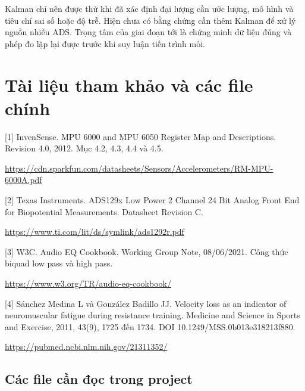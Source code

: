 \documentclass[12pt,letterpaper]{article}
\begin{document}
Kalman chỉ nên được thử khi đã xác định đại lượng cần ước lượng, mô hình và tiêu chí sai số hoặc độ trễ. Hiện chưa có bằng chứng cần thêm Kalman để xử lý nguồn nhiễu ADS. Trọng tâm của giai đoạn tới là chứng minh dữ liệu đúng và phép đo lặp lại được trước khi suy luận tiến trình mỏi.


\par\endgroup




\clearpage

\section{Tài liệu tham khảo và các file chính}

\hypertarget{ref1}{}[1] InvenSense. MPU 6000 and MPU 6050 Register Map and Descriptions. Revision 4.0, 2012. Mục 4.2, 4.3, 4.4 và 4.5.\par
\url{https://cdn.sparkfun.com/datasheets/Sensors/Accelerometers/RM-MPU-6000A.pdf}\par\medskip

\hypertarget{ref2}{}[2] Texas Instruments. ADS129x Low Power 2 Channel 24 Bit Analog Front End for Biopotential Measurements. Datasheet Revision C.\par
\url{https://www.ti.com/lit/ds/symlink/ads1292r.pdf}\par\medskip

\hypertarget{ref3}{}[3] W3C. Audio EQ Cookbook. Working Group Note, 08/06/2021. Công thức biquad low pass và high pass.\par
\url{https://www.w3.org/TR/audio-eq-cookbook/}\par\medskip

\hypertarget{ref4}{}[4] Sánchez Medina L và González Badillo JJ. Velocity loss as an indicator of neuromuscular fatigue during resistance training. Medicine and Science in Sports and Exercise, 2011, 43(9), 1725 đến 1734. DOI 10.1249/MSS.0b013e318213f880.\par
\url{https://pubmed.ncbi.nlm.nih.gov/21311352/}\par\medskip

\subsection*{Các file cần đọc trong project}
\end{document}
